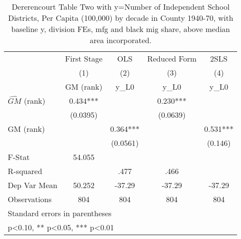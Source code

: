 \begin{table}[htbp]\centering
\def\sym#1{\ifmmode^{#1}\else\(^{#1}\)\fi}
\caption{Dererencourt Table Two with y=Number of Independent School Districts, Per Capita (100,000) by decade in County 1940-70, with baseline y, division FEs, mfg and black mig share, above median area incorporated.}
\begin{tabular}{l*{4}{c}}
\toprule
                    & First Stage   &         OLS   &Reduced Form   &        2SLS   \\
                    &\multicolumn{1}{c}{(1)}&\multicolumn{1}{c}{(2)}&\multicolumn{1}{c}{(3)}&\multicolumn{1}{c}{(4)}\\
                    &\multicolumn{1}{c}{GM  (rank)}&\multicolumn{1}{c}{y\_L0}&\multicolumn{1}{c}{y\_L0}&\multicolumn{1}{c}{y\_L0}\\
\midrule
$\hat{GM}$ (rank)   &       0.434***&               &       0.230***&               \\
                    &    (0.0395)   &               &    (0.0639)   &               \\
\addlinespace
GM  (rank)          &               &       0.364***&               &       0.531***\\
                    &               &    (0.0561)   &               &     (0.146)   \\
\midrule
F-Stat              &      54.055   &               &               &               \\
R-squared           &               &        .477   &        .466   &               \\
Dep Var Mean        &      50.252   &      -37.29   &      -37.29   &      -37.29   \\
Observations        &         804   &         804   &         804   &         804   \\
\bottomrule
\multicolumn{5}{l}{\footnotesize Standard errors in parentheses}\\
\multicolumn{5}{l}{\footnotesize * p<0.10, ** p<0.05, *** p<0.01}\\
\end{tabular}
\end{table}
